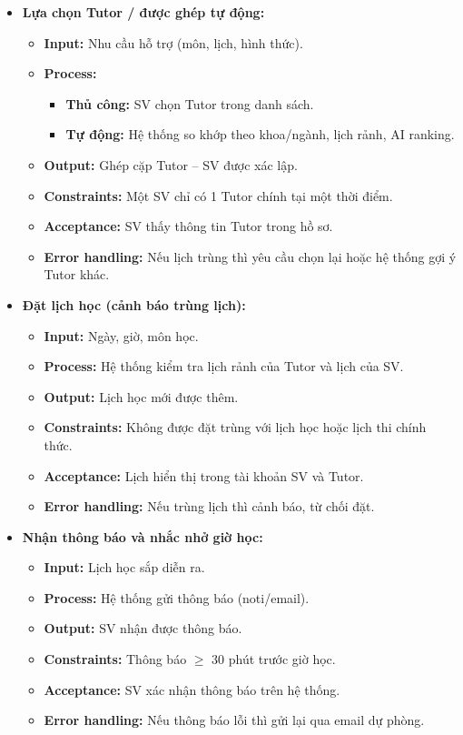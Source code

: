 \begin{itemize}
    \item \textbf{Lựa chọn Tutor / được ghép tự động:}
    \begin{itemize}
        \item \textbf{Input:} Nhu cầu hỗ trợ (môn, lịch, hình thức).
        \item \textbf{Process:} 
        \begin{itemize}
            \item \textbf{Thủ công:} SV chọn Tutor trong danh sách.
            \item \textbf{Tự động: } Hệ thống so khớp theo khoa/ngành, lịch rảnh, AI ranking.
        \end{itemize}
        \item \textbf{Output:} Ghép cặp Tutor – SV được xác lập.
        \item \textbf{Constraints:} Một SV chỉ có 1 Tutor chính tại một thời điểm.
        \item \textbf{Acceptance:} SV thấy thông tin Tutor trong hồ sơ.
        \item \textbf{Error handling:} Nếu lịch trùng thì yêu cầu chọn lại hoặc hệ thống gợi ý Tutor khác.
    \end{itemize}

    \item \textbf{Đặt lịch học (cảnh báo trùng lịch):}
    \begin{itemize}
        \item \textbf{Input:} Ngày, giờ, môn học.
        \item \textbf{Process:} Hệ thống kiểm tra lịch rảnh của Tutor và lịch của SV.
        \item \textbf{Output:} Lịch học mới được thêm.
        \item \textbf{Constraints:} Không được đặt trùng với lịch học hoặc lịch thi chính thức.
        \item \textbf{Acceptance:} Lịch hiển thị trong tài khoản SV và Tutor.
        \item \textbf{Error handling:} Nếu trùng lịch thì cảnh báo, từ chối đặt.
    \end{itemize}

    \item \textbf{Nhận thông báo và nhắc nhở giờ học:}
    \begin{itemize}
        \item \textbf{Input:} Lịch học sắp diễn ra.
        \item \textbf{Process:} Hệ thống gửi thông báo (noti/email).
        \item \textbf{Output:} SV nhận được thông báo.
        \item \textbf{Constraints:} Thông báo $\geq$ 30 phút trước giờ học.
        \item \textbf{Acceptance:} SV xác nhận thông báo trên hệ thống.
        \item \textbf{Error handling:} Nếu thông báo lỗi thì gửi lại qua email dự phòng.
    \end{itemize}


\end{itemize}
